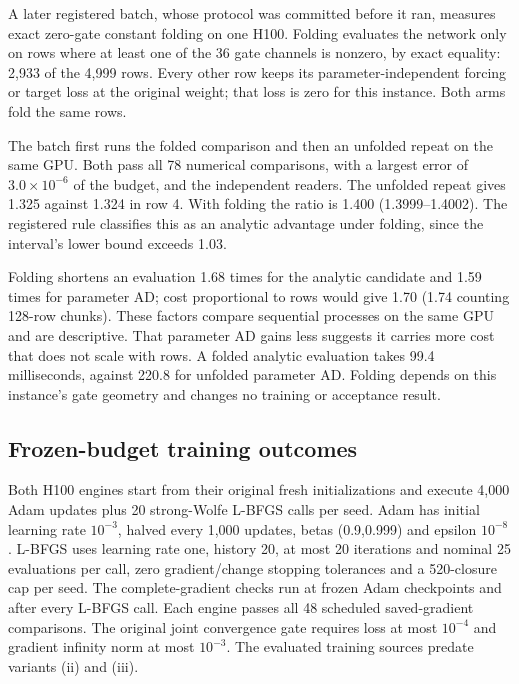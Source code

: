 \documentclass[11pt]{article}
\begin{document}
A later registered batch, whose protocol was committed before it ran,
measures exact zero-gate constant folding on one H100. Folding evaluates
the network only on rows where at least one of the 36 gate channels is
nonzero, by exact equality: 2,933 of the 4,999 rows. Every other row keeps
its parameter-independent forcing or target loss at the original weight;
that loss is zero for this instance. Both arms fold the same rows.

The batch first runs the folded comparison and then an unfolded repeat on
the same GPU. Both pass all 78 numerical comparisons, with a largest error
of $3.0\times10^{-6}$ of the budget, and the independent readers. The
unfolded repeat gives 1.325 against 1.324 in row 4. With folding the ratio
is 1.400 (1.3999--1.4002). The registered rule classifies this as an
analytic advantage under folding, since the interval's lower bound exceeds
1.03.

Folding shortens an evaluation 1.68 times for the analytic candidate and
1.59 times for parameter AD; cost proportional to rows would give 1.70
(1.74 counting 128-row chunks). These factors compare sequential processes on the same GPU and are descriptive.
That parameter AD gains less suggests it carries more cost that does not
scale with rows. A folded analytic evaluation takes 99.4 milliseconds,
against 220.8 for unfolded parameter AD. Folding depends on this
instance's gate geometry and changes no training or acceptance result.

\subsection{Frozen-budget training outcomes}
Both H100 engines start from their original fresh initializations and
execute 4,000 Adam updates plus 20 strong-Wolfe L-BFGS calls per seed.
Adam has initial learning rate $10^{-3}$, halved every 1,000 updates,
betas (0.9,0.999) and epsilon $10^{-8}$. L-BFGS uses learning rate one,
history 20, at most 20 iterations and nominal 25 evaluations per call,
zero gradient/change stopping tolerances and a 520-closure cap per seed.
The complete-gradient checks run at frozen Adam checkpoints and after
every L-BFGS call. Each engine passes all 48 scheduled saved-gradient
comparisons. The original joint convergence gate requires loss at most
$10^{-4}$ and gradient infinity norm at most $10^{-3}$. The evaluated
training sources predate variants (ii) and (iii).
\end{document}
